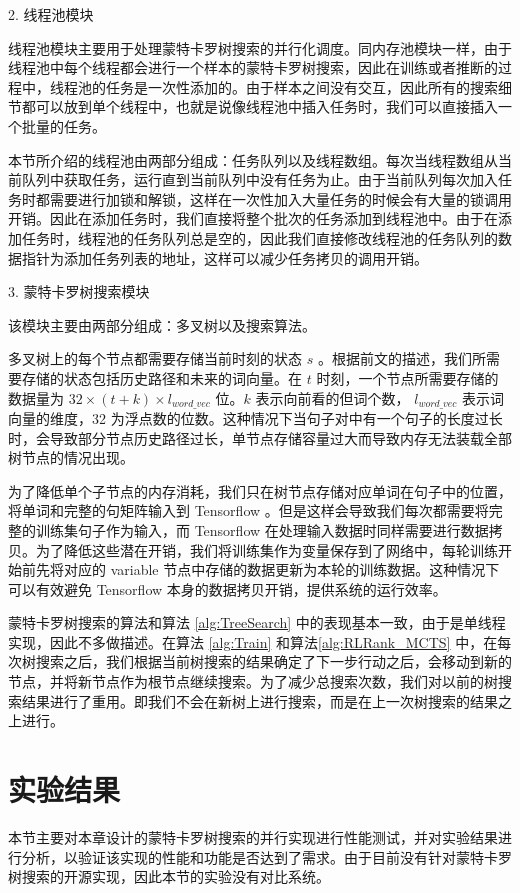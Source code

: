 2. 线程池模块

线程池模块主要用于处理蒙特卡罗树搜索的并行化调度。同内存池模块一样，由于线程池中每个线程都会进行一个样本的蒙特卡罗树搜索，因此在训练或者推断的过程中，线程池的任务是一次性添加的。由于样本之间没有交互，因此所有的搜索细节都可以放到单个线程中，也就是说像线程池中插入任务时，我们可以直接插入一个批量的任务。

本节所介绍的线程池由两部分组成：任务队列以及线程数组。每次当线程数组从当前队列中获取任务，运行直到当前队列中没有任务为止。由于当前队列每次加入任务时都需要进行加锁和解锁，这样在一次性加入大量任务的时候会有大量的锁调用开销。因此在添加任务时，我们直接将整个批次的任务添加到线程池中。由于在添加任务时，线程池的任务队列总是空的，因此我们直接修改线程池的任务队列的数据指针为添加任务列表的地址，这样可以减少任务拷贝的调用开销。

3. 蒙特卡罗树搜索模块

该模块主要由两部分组成：多叉树以及搜索算法。

多叉树上的每个节点都需要存储当前时刻的状态 $s$ 。根据前文的描述，我们所需要存储的状态包括历史路径和未来的词向量。在 $t$ 时刻，一个节点所需要存储的数据量为 $32\times(t+k)\times l_{word\_vec}$ 位。$k$ 表示向前看的但词个数， $l_{{word\_vec}}$ 表示词向量的维度，32 为浮点数的位数。这种情况下当句子对中有一个句子的长度过长时，会导致部分节点历史路径过长，单节点存储容量过大而导致内存无法装载全部树节点的情况出现。

为了降低单个子节点的内存消耗，我们只在树节点存储对应单词在句子中的位置，将单词和完整的句矩阵输入到 Tensorflow 。但是这样会导致我们每次都需要将完整的训练集句子作为输入，而 Tensorflow 在处理输入数据时同样需要进行数据拷贝。为了降低这些潜在开销，我们将训练集作为变量保存到了网络中，每轮训练开始前先将对应的 variable 节点中存储的数据更新为本轮的训练数据。这种情况下可以有效避免 Tensorflow 本身的数据拷贝开销，提供系统的运行效率。

蒙特卡罗树搜索的算法和算法 \ref{alg:TreeSearch} 中的表现基本一致，由于是单线程实现，因此不多做描述。在算法 \ref{alg:Train} 和算法\ref{alg:RLRank_MCTS} 中，在每次树搜索之后，我们根据当前树搜索的结果确定了下一步行动之后，会移动到新的节点，并将新节点作为根节点继续搜索。为了减少总搜索次数，我们对以前的树搜索结果进行了重用。即我们不会在新树上进行搜索，而是在上一次树搜索的结果之上进行。

\section{实验结果}
本节主要对本章设计的蒙特卡罗树搜索的并行实现进行性能测试，并对实验结果进行分析，以验证该实现的性能和功能是否达到了需求。由于目前没有针对蒙特卡罗树搜索的开源实现，因此本节的实验没有对比系统。
